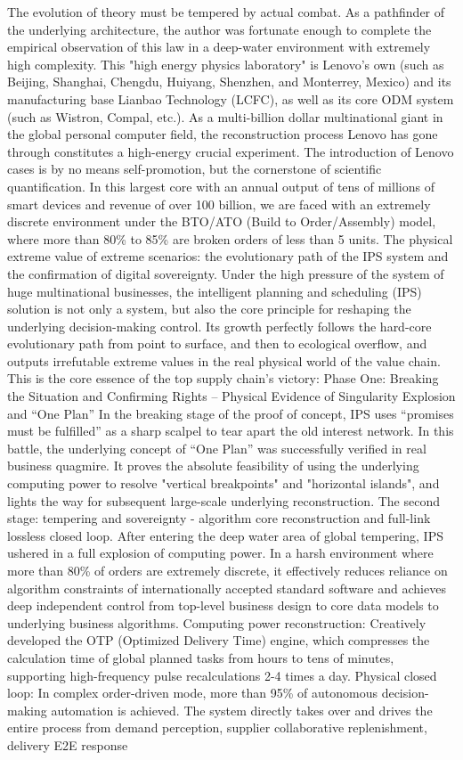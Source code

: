 \documentclass[11pt,a4paper]{article}
\begin{document}
The evolution of theory must be tempered by actual combat. As a pathfinder of the underlying architecture, the author was fortunate enough to complete the empirical observation of this law in a deep-water environment with extremely high complexity. This "high energy physics laboratory" is Lenovo's own (such as Beijing, Shanghai, Chengdu, Huiyang, Shenzhen, and Monterrey, Mexico) and its manufacturing base Lianbao Technology (LCFC), as well as its core ODM system (such as Wistron, Compal, etc.). As a multi-billion dollar multinational giant in the global personal computer field, the reconstruction process Lenovo has gone through constitutes a high-energy crucial experiment. The introduction of Lenovo cases is by no means self-promotion, but the cornerstone of scientific quantification. In this largest core with an annual output of tens of millions of smart devices and revenue of over 100 billion, we are faced with an extremely discrete environment under the BTO/ATO (Build to Order/Assembly) model, where more than 80\% to 85\% are broken orders of less than 5 units. The physical extreme value of extreme scenarios: the evolutionary path of the IPS system and the confirmation of digital sovereignty. Under the high pressure of the system of huge multinational businesses, the intelligent planning and scheduling (IPS) solution is not only a system, but also the core principle for reshaping the underlying decision-making control. Its growth perfectly follows the hard-core evolutionary path from point to surface, and then to ecological overflow, and outputs irrefutable extreme values in the real physical world of the value chain. This is the core essence of the top supply chain’s victory: Phase One: Breaking the Situation and Confirming Rights – Physical Evidence of Singularity Explosion and “One Plan” In the breaking stage of the proof of concept, IPS uses “promises must be fulfilled” as a sharp scalpel to tear apart the old interest network. In this battle, the underlying concept of “One Plan” was successfully verified in real business quagmire. It proves the absolute feasibility of using the underlying computing power to resolve "vertical breakpoints" and "horizontal islands", and lights the way for subsequent large-scale underlying reconstruction. The second stage: tempering and sovereignty - algorithm core reconstruction and full-link lossless closed loop. After entering the deep water area of global tempering, IPS ushered in a full explosion of computing power. In a harsh environment where more than 80\% of orders are extremely discrete, it effectively reduces reliance on algorithm constraints of internationally accepted standard software and achieves deep independent control from top-level business design to core data models to underlying business algorithms. Computing power reconstruction: Creatively developed the OTP (Optimized Delivery Time) engine, which compresses the calculation time of global planned tasks from hours to tens of minutes, supporting high-frequency pulse recalculations 2-4 times a day. Physical closed loop: In complex order-driven mode, more than 95\% of autonomous decision-making automation is achieved. The system directly takes over and drives the entire process from demand perception, supplier collaborative replenishment, delivery E2E response 
\end{document}

